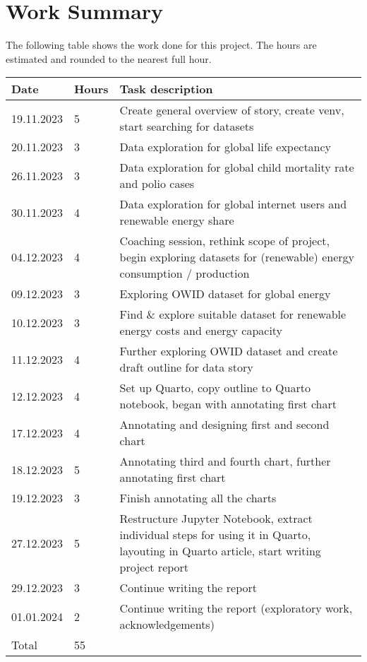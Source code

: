 \documentclass{article}
\begin{document}
\newpage

\section{Work Summary}

The following table shows the work done for this project.
The hours are estimated and rounded to the nearest full hour.

\begin{table}[!ht]
    \centering
    \begin{tabular}{|p{2cm}|p{1cm}|p{7.5cm}|}
    \hline
        \textbf{Date} & \textbf{Hours} & \textbf{Task description} \\ \hline
        19.11.2023 & 5 & Create general overview of story, create venv, start searching for datasets \\ \hline
        20.11.2023 & 3 & Data exploration for global life expectancy \\ \hline
        26.11.2023 & 3 & Data exploration for global child mortality rate and polio cases \\ \hline
        30.11.2023 & 4 & Data exploration for global internet users and renewable energy share \\ \hline
        04.12.2023 & 4 & Coaching session, rethink scope of project, begin exploring datasets for (renewable) energy consumption / production \\ \hline
        09.12.2023 & 3 & Exploring OWID dataset for global energy \\ \hline
        10.12.2023 & 3 & Find \& explore suitable dataset for renewable energy costs and energy capacity \\ \hline
        11.12.2023 & 4 & Further exploring OWID dataset and create draft outline for data story \\ \hline
        12.12.2023 & 4 & Set up Quarto, copy outline to Quarto notebook, began with annotating first chart \\ \hline
        17.12.2023 & 4 & Annotating and designing first and second chart \\ \hline
        18.12.2023 & 5 & Annotating third and fourth chart, further annotating first chart \\ \hline
        19.12.2023 & 3 & Finish annotating all the charts \\ \hline
        27.12.2023 & 5 & Restructure Jupyter Notebook, extract individual steps for using it in Quarto, layouting in Quarto article, start writing project report \\ \hline
        29.12.2023 & 3 & Continue writing the report \\ \hline
        01.01.2024 & 2 & Continue writing the report (exploratory work, acknowledgements) \\ \hline
        \hline
        Total & 55 &  \\ \hline
    \end{tabular}
\end{table}
\end{document}

